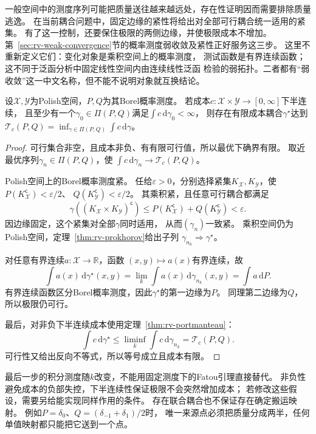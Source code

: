 一般空间中的测度序列可能把质量送往越来越远处，存在性证明因而需要排除质量逃逸。
在当前耦合问题中，固定边缘的紧性将给出对全部可行耦合统一适用的紧集。
有了这一控制，还要保住极限的两侧边缘，并使极限成本不增加。
第~\ref{sec:rv-weak-convergence}节的概率测度弱收敛及紧性正好服务这三步。
这里不重新定义它们：变化对象是乘积空间上的概率测度，
测试函数是有界连续函数；这不同于泛函分析中固定线性空间内由连续线性泛函
检验的弱拓扑。二者都有“弱收敛”这一中文名称，但不能不说明对象就互换结论。

\begin{theorem}[最优耦合存在]
\label{thm:information-optimal-coupling-existence}
设\(\mathcal X,\mathcal Y\)为Polish空间，\(P,Q\)为其Borel概率测度。
若成本\(c:\mathcal X\times\mathcal Y\to[0,\infty]\)下半连续，
且至少有一个\(\gamma_0\in\Pi(P,Q)\)满足\(\int c\,\mathrm d\gamma_0<\infty\)，
则存在有限成本耦合\(\gamma^\star\)达到
\(\mathcal T_c(P,Q)=\inf_{\gamma\in\Pi(P,Q)}\int c\,\mathrm d\gamma\)。
\end{theorem}
\begin{proof}
可行集合非空，且成本非负、有有限可行值，所以最优下确界有限。
取近最优序列\(\gamma_n\in\Pi(P,Q)\)，使
\(\int c\,\mathrm d\gamma_n\to\mathcal T_c(P,Q)\)。

Polish空间上的Borel概率测度紧。
任给\(\varepsilon>0\)，分别选择紧集\(K_{\mathcal X},K_{\mathcal Y}\)，使
\(P(K_{\mathcal X}^{\mathsf c})<\varepsilon/2\)、
\(Q(K_{\mathcal Y}^{\mathsf c})<\varepsilon/2\)。
其乘积紧，且任意可行耦合都满足
\[
  \gamma((K_{\mathcal X}\times K_{\mathcal Y})^{\mathsf c})
  \leq P(K_{\mathcal X}^{\mathsf c})+Q(K_{\mathcal Y}^{\mathsf c})
  <\varepsilon.
\]
因边缘固定，这个紧集对全部\(\gamma\)同时适用，
从而\((\gamma_n)\)一致紧。
乘积空间仍为Polish空间，定理~\ref{thm:rv-prokhorov}给出子列
\(\gamma_{n_k}\Rightarrow\gamma^\star\)。

对任意有界连续\(a:\mathcal X\to\mathbb R\)，函数
\((x,y)\mapsto a(x)\)有界连续，故
\[
  \int a(x)\,\mathrm d\gamma^\star(x,y)
  =\lim_k\int a(x)\,\mathrm d\gamma_{n_k}(x,y)=\int a\,\mathrm dP.
\]
有界连续函数区分Borel概率测度，因此\(\gamma^\star\)的第一边缘为\(P\)。
同理第二边缘为\(Q\)，所以极限仍可行。

最后，对非负下半连续成本使用定理~\ref{thm:rv-portmanteau}：
\[
  \int c\,\mathrm d\gamma^\star
  \leq\liminf_k\int c\,\mathrm d\gamma_{n_k}
  =\mathcal T_c(P,Q).
\]
可行性又给出反向不等式，所以等号成立且成本有限。
\end{proof}

最后一步的积分测度随\(k\)改变，不能用固定测度下的Fatou引理直接替代。
非负性避免成本的负部失控，下半连续性保证极限不会突然增加成本；
若修改这些假设，需要另给能实现同样作用的条件。
存在联合耦合也不保证存在确定搬运映射。
例如\(P=\delta_0\)、\(Q=(\delta_{-1}+\delta_1)/2\)时，
唯一来源点必须把质量分成两半，任何单值映射都只能把它送到一个点。

